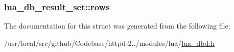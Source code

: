 \subsubsection[{\texorpdfstring{rows}{rows}}]{ lua\+\_\+db\+\_\+result\+\_\+set\+::rows}\hypertarget{structlua__db__result__set_ac148b93b6d46bb3ec85b08a31b9ff943}{}\label{structlua__db__result__set_ac148b93b6d46bb3ec85b08a31b9ff943}


The documentation for this struct was generated from the following file\+:\begin{DoxyCompactItemize}
\item 
/usr/local/src/github/\+Codebase/httpd-\/2../modules/lua/\hyperlink{lua__dbd_8h}{lua\+\_\+dbd.\+h}\end{DoxyCompactItemize}
